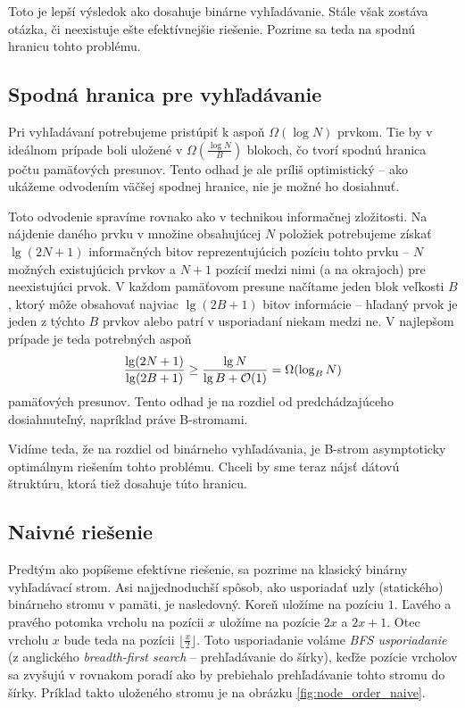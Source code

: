 Toto je lepší výsledok ako dosahuje binárne vyhľadávanie. Stále však zostáva otázka, či neexistuje  ešte efektívnejšie riešenie. Pozrime sa teda na spodnú hranicu tohto problému.

\subsection{Spodná hranica pre vyhľadávanie} \label{sec:tree-lowerbound}
Pri vyhľadávaní potrebujeme pristúpiť k aspoň $\Omega(\log{N})$ prvkom. Tie by v ideálnom prípade boli uložené v $\Omega(\frac{\log{N}}{B})$ blokoch, čo tvorí spodnú hranica počtu pamäťových presunov. Tento odhad je ale príliš optimistický -- ako ukážeme odvodením väčšej spodnej hranice, nie je možné ho dosiahnuť.

Toto odvodenie spravíme rovnako ako v \citep{demaineoverview} technikou informačnej zložitosti. Na nájdenie daného prvku v množine obsahujúcej $N$ položiek potrebujeme získať $\lg(2N+1)$ informačných bitov reprezentujúcich pozíciu tohto prvku -- $N$ možných existujúcich prvkov a $N+1$ pozícií medzi nimi (a na okrajoch) pre neexistujúci prvok. V každom pamäťovom presune načítame jeden blok veľkosti $B$, ktorý môže obsahovať najviac $\lg(2B+1)$ bitov informácie -- hľadaný prvok je jeden z týchto $B$ prvkov alebo patrí v usporiadaní niekam medzi ne. V najlepšom prípade je teda potrebných aspoň
\[
\frac{\lg(2N+1)}{\lg(2B+1)} \ge \frac{\lg N}{\lg B+\mathcal{O}(1)} = \Omega(\log_B{N})
\]
pamäťových presunov. Tento odhad je na rozdiel od predchádzajúceho dosiahnuteľný, napríklad práve \aware B-stromami.

Vidíme teda, že na rozdiel od \obliv binárneho vyhľadávania, je \aware B-strom asymptoticky optimálnym riešením tohto problému. Chceli by sme teraz nájsť \obliv dátovú štruktúru, ktorá tiež dosahuje túto hranicu.

\subsection{Naivné \obliv riešenie} \label{sec:static-naive}
Predtým ako popíšeme efektívne \obliv riešenie, sa pozrime na klasický binárny vyhľadávací strom. Asi najjednoduchší spôsob, ako usporiadať uzly (statického) binárneho stromu v pamäti, je nasledovný. Koreň uložíme na pozíciu $1$. Ľavého a pravého potomka vrcholu na pozícii $x$ uložíme na pozície $2x$ a $2x+1$. Otec vrcholu $x$ bude teda na pozícii $\lfloor\frac{x}{2}\rfloor$. Toto usporiadanie voláme \emph{BFS usporiadanie} (z anglického \emph{breadth-first search} -- prehľadávanie do šírky), keďže pozície vrcholov sa zvyšujú v rovnakom poradí ako by prebiehalo prehľadávanie tohto stromu do šírky. Príklad takto uloženého stromu je na obrázku \ref{fig:node_order_naive}.

